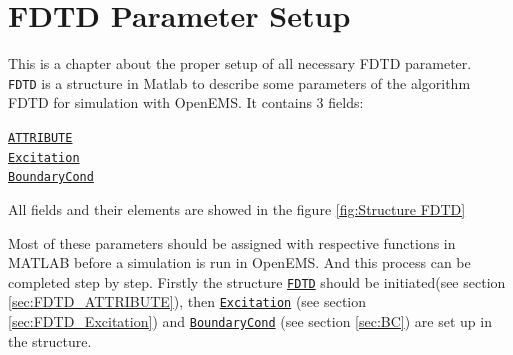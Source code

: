 \chapter{FDTD Parameter Setup}\label{chap:FDTD Parameter Setup}
This is a chapter about the proper setup of all necessary FDTD parameter.\\
\texttt{FDTD}    is a structure in Matlab to describe some parameters of the algorithm FDTD for simulation with OpenEMS. It contains 3 fields:  \label{para:FDTD} %
       \begin{myindentpar}
	      \hyperref[para:FDTD_ATTRIBUTE]{\texttt{ATTRIBUTE}} \\ 
	      \hyperref[para:Excitation]{\texttt{Excitation}}  \\ 
	      \hyperref[para:BoundaryCond]{\texttt{BoundaryCond}}
       \end{myindentpar}
All fields and  their elements  are showed in the figure \ref{fig:Structure FDTD}


  \def\svgwidth{0.8\textwidth}

Most of these parameters should be assigned with respective functions in MATLAB before a simulation is run in OpenEMS. And this process can be completed step by step. Firstly the structure \hyperref[para:FDTD]{\texttt{FDTD}} should be initiated(see section \ref{sec:FDTD_ATTRIBUTE}), then  \hyperref[para:Excitation]{\texttt{Excitation}} (see section \ref{sec:FDTD_Excitation}) and \hyperref[para:BoundaryCond]{\texttt{BoundaryCond}} (see section \ref{sec:BC}) are set up in the structure.%

